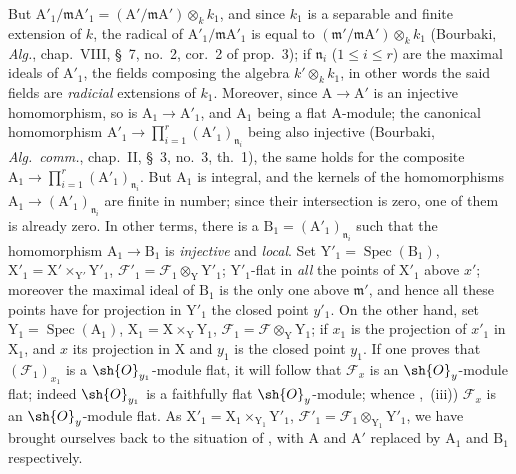 \begin{env}[11.7.1]
But $\mathrm{A}'_1/\mathfrak{m}\mathrm{A}'_1=(\mathrm{A}'/\mathfrak{m}\mathrm{A}')\otimes_k k_1$, and since $k_1$ is a separable and finite extension of $k$, the radical of $\mathrm{A}'_1/\mathfrak{m}\mathrm{A}'_1$ is equal to $(\mathfrak{m}'/\mathfrak{m}\mathrm{A}')\otimes_k k_1$ (Bourbaki, \emph{Alg.}, chap.~VIII, \S~7, no.~2, cor.~2 of prop.~3); if $\mathfrak{n}_i$ ($1\leq i\leq r$) are the maximal ideals of $\mathrm{A}'_1$, the fields composing the algebra $k'\otimes_k k_1$, in other words the said fields are \emph{radicial} extensions of $k_1$.
Moreover, since $\mathrm{A}\to\mathrm{A}'$ is an injective homomorphism, so is $\mathrm{A}_1\to\mathrm{A}'_1$, and $\mathrm{A}_1$ being a flat $\mathrm{A}$-module; the canonical homomorphism $\mathrm{A}'_1\to\prod_{i=1}^r (\mathrm{A}'_1)_{\mathfrak{n}_i}$ being also injective (Bourbaki, \emph{Alg.\ comm.}, chap.~II, \S~3, no.~3, th.~1), the same holds for the composite $\mathrm{A}_1\to\prod_{i=1}^r(\mathrm{A}'_1)_{\mathfrak{n}_i}$.
But $\mathrm{A}_1$ is integral, and the kernels of the homomorphisms $\mathrm{A}_1\to(\mathrm{A}'_1)_{\mathfrak{n}_i}$ are finite in number; since their intersection is zero, one of them is already zero.
In other terms, there is a $\mathrm{B}_1=(\mathrm{A}'_1)_{\mathfrak{n}_i}$ such that the homomorphism $\mathrm{A}_1\to\mathrm{B}_1$ is \emph{injective} and \emph{local}.
Set $\mathrm{Y}'_1=\operatorname{Spec}(\mathrm{B}_1)$, $\mathrm{X}'_1=\mathrm{X}'\times_{\mathrm{Y}'}\mathrm{Y}'_1$, $\mathscr{F}'_1=\mathscr{F}_1\otimes_\mathrm{Y}\mathrm{Y}'_1$; $\mathrm{Y}'_1$-flat in \emph{all} the points of $\mathrm{X}'_1$ above $x'$; moreover the maximal ideal of $\mathrm{B}_1$ is the only one above $\mathfrak{m}'$, and hence all these points have for projection in $\mathrm{Y}'_1$ the closed point $y'_1$.
On the other hand, set $\mathrm{Y}_1=\operatorname{Spec}(\mathrm{A}_1)$, $\mathrm{X}_1=\mathrm{X}\times_\mathrm{Y}\mathrm{Y}_1$, $\mathscr{F}_1=\mathscr{F}\otimes_\mathrm{Y}\mathrm{Y}_1$; if $x_1$ is the projection of $x'_1$ in $\mathrm{X}_1$, and $x$ its projection in $\mathrm{X}$ and $y_1$ is the closed point $y_1$.
If one proves that $(\mathscr{F}_1)_{x_1}$ is a $\sh{O}_{y_1}$-module flat, it will follow that $\mathscr{F}_x$ is an $\sh{O}_y$-module flat; indeed $\sh{O}_{y_1}$ is a faithfully flat $\sh{O}_y$-module; whence ,~(iii)) $\mathscr{F}_x$ is an $\sh{O}_y$-module flat.
As $\mathrm{X}'_1=\mathrm{X}_1\times_{\mathrm{Y}_1}\mathrm{Y}'_1$, $\mathscr{F}'_1=\mathscr{F}_1\otimes_{\mathrm{Y}_1}\mathrm{Y}'_1$, we have brought ourselves back to the situation of , with $\mathrm{A}$ and $\mathrm{A}'$ replaced by $\mathrm{A}_1$ and $\mathrm{B}_1$ respectively.


\end{env}
